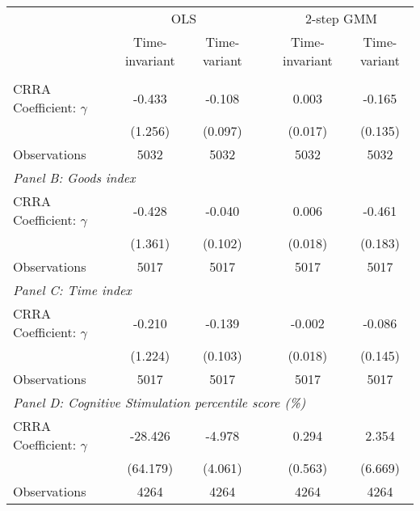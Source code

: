 {
\begin{tabular}{l*{5}{c}}
\toprule
                &\multicolumn{2}{c}{OLS} && \multicolumn{2}{c}{2-step GMM}\\ \cline{2-3} \cline{5-6}
                	& Time-invariant & Time-variant && Time-invariant & Time-variant \\
\midrule
\addlinespace \multicolumn{6}{l}{\textit{Panel A: HOME index}} \\
CRRA Coefficient: $\gamma$&   -0.433         &     -0.108      &       &    0.003         &       -0.165           \\
                &  (1.256)         &      (0.097)           & &  (0.017)         &       (0.135)           \\
\midrule
Observations    &     5032         &     5032   &      &     5032         &     5032         \\

\midrule

 \multicolumn{6}{l}{\textit{Panel B: Goods index}} \\
CRRA Coefficient: $\gamma$&   -0.428         &      -0.040     &       &    0.006         &     -0.461\sym{**}             \\
                &  (1.361)         &       (0.102)          & &  (0.018)         &        (0.183)          \\
\midrule
Observations    &     5017         &     5017    &     &     5017         &     5017         \\

\midrule

 \multicolumn{6}{l}{\textit{Panel C: Time index}} \\
CRRA Coefficient: $\gamma$&   -0.210         &      -0.139       &     &   -0.002         &         -0.086           \\
                &  (1.224)         &       (0.103)          & &  (0.018)         &         (0.145)         \\
\midrule
Observations    &     5017         &     5017         & &    5017         &     5017         \\

\midrule

 \multicolumn{6}{l}{\textit{Panel D: Cognitive Stimulation percentile score (\%)}} \\
CRRA Coefficient: $\gamma$&  -28.426         &     -4.978  &            &    0.294         &      2.354               \\
                & (64.179)         &       (4.061)          & &  (0.563)         &        (6.669)           \\
\addlinespace
\midrule
Observations    &     4264         &     4264         &   &  4264         &     4264         \\


\end{tabular}}
